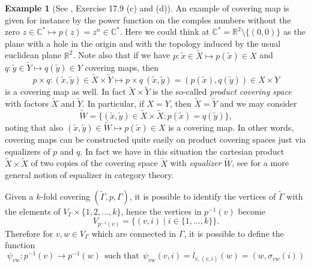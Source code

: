 \documentclass{amsart}
\theoremstyle{definition}
\newtheorem{example}[theo]{Example}
\numberwithin{equation}{section}
\begin{document}
\begin{example}[See \cite{kos}, Exercise 17.9 (c) and (d)]\label{pcv} An example of covering map is given for instance by the power function on the comples numbers without the zero $ z \in \mathbb{C}^* \mapsto p(z)=z^n \in \mathbb{C}^*.$ Here we could think at  $\mathbb{C}^* =\mathbb{R}^2 \setminus \{(0,0)\}$ as the plane with a hole in the origin and with the topology induced  by  the usual euclidean plane $\mathbb{R}^2$. Note also that if we have $p: \widetilde{x}\in \widetilde{X} \mapsto p(\widetilde{x}) \in X$ and $q: \widetilde{y} \in \widetilde{Y} \mapsto q(\widetilde{y}) \in Y$  covering maps, then \begin{equation}p \times q: (\widetilde{x}, \widetilde{y}) \in \widetilde{X} \times \widetilde{Y} \mapsto p \times q  \ (\widetilde{x}, \widetilde{y}) = (p(\widetilde{x}), q(\widetilde{y})) \in X \times Y\end{equation} is a covering map as well. In fact  $\widetilde{X} \times \widetilde{Y} $ is the so-called \textit{product covering space} with factors $\widetilde{X}$ and  $\widetilde{Y}$.  In particular,  if $X=Y$, then $\widetilde{X}=\widetilde{Y}$ and we may consider
\begin{equation}\widetilde{W}=\{(\widetilde{x},\widetilde{y}) \in \widetilde{X} \times \widetilde{X}: p(\widetilde{x})=q(\widetilde{y})\},\end{equation}
noting that also $ (\widetilde{x},\widetilde{y}) \in \widetilde{W} \mapsto p(\widetilde{x}) \in X$ is a covering map. In other words, covering maps can be constructed quite easily on  product covering spaces just via equalizers of $p$ and $q$. In fact we have in this situation  the cartesian product $\widetilde{X} \times \widetilde{X} $ of two copies of the covering space $\widetilde{X}$ with  \textit{equalizer} $\widetilde{W}$, see \cite[Definition A3.43 (ii)]{hofmor} for a more general notion of equalizer in  category theory.
\end{example}
Given a $k$-fold covering $(\widetilde{\Gamma}, p, \Gamma)$, it is possible to identify the vertices of $\widetilde{\Gamma}$ with the elements of $V_\Gamma \times \{1, 2, \dots, k\}$, hence the vertices in  $p^{-1}(v)$ become
\begin{equation}V_{p^{-1}(v)} =\{ (v,i)  \mid i \in \{1, \dots, k\}\}. \end{equation} Therefore for $v,  w \in V_\Gamma$ which are connected in $\Gamma$, it is possible to define the function \begin{equation} \psi_{vw}: p^{-1}(v) \longrightarrow p^{-1}(w) \ \ \mbox{such that}
 \ \     \psi_{vw}(v,i) = l_{v,(v,i)}(w) = (w, \sigma_{vw}(i)) 
\end{equation}   
\end{document}
